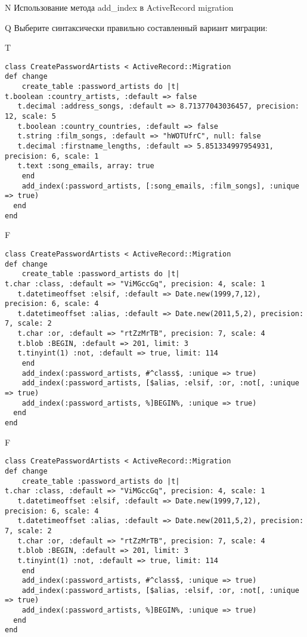 N 
Использование метода add_index в ActiveRecord migration

Q
Выберите синтаксически правильно составленный вариант миграции:

T
\begin{verbatim}
class CreatePasswordArtists < ActiveRecord::Migration
def change
	create_table :password_artists do |t|
t.boolean :country_artists, :default => false
   t.decimal :address_songs, :default => 8.71377043036457, precision: 12, scale: 5
   t.boolean :country_countries, :default => false
   t.string :film_songs, :default => "hWOTUfrC", null: false
   t.decimal :firstname_lengths, :default => 5.851334997954931, precision: 6, scale: 1
   t.text :song_emails, array: true
   	end
	add_index(:password_artists, [:song_emails, :film_songs], :unique => true)
  end 
end

\end{verbatim}

F
\begin{verbatim}
class CreatePasswordArtists < ActiveRecord::Migration
def change
	create_table :password_artists do |t|
t.char :class, :default => "ViMGccGq", precision: 4, scale: 1
   t.datetimeoffset :elsif, :default => Date.new(1999,7,12), precision: 6, scale: 4
   t.datetimeoffset :alias, :default => Date.new(2011,5,2), precision: 7, scale: 2
   t.char :or, :default => "rtZzMrTB", precision: 7, scale: 4
   t.blob :BEGIN, :default => 201, limit: 3
   t.tinyint(1) :not, :default => true, limit: 114
   	end
	add_index(:password_artists, #^class$, :unique => true)
 	add_index(:password_artists, [$alias, :elsif, :or, :not[, :unique => true)
 	add_index(:password_artists, %]BEGIN%, :unique => true)
  end 
end

\end{verbatim}

F
\begin{verbatim}
class CreatePasswordArtists < ActiveRecord::Migration
def change
	create_table :password_artists do |t|
t.char :class, :default => "ViMGccGq", precision: 4, scale: 1
   t.datetimeoffset :elsif, :default => Date.new(1999,7,12), precision: 6, scale: 4
   t.datetimeoffset :alias, :default => Date.new(2011,5,2), precision: 7, scale: 2
   t.char :or, :default => "rtZzMrTB", precision: 7, scale: 4
   t.blob :BEGIN, :default => 201, limit: 3
   t.tinyint(1) :not, :default => true, limit: 114
   	end
	add_index(:password_artists, #^class$, :unique => true)
 	add_index(:password_artists, [$alias, :elsif, :or, :not[, :unique => true)
 	add_index(:password_artists, %]BEGIN%, :unique => true)
  end 
end

\end{verbatim}

